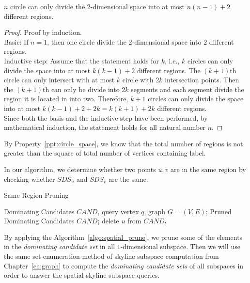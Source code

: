 \begin{property}
\label{ppt:circle_space}
$n$ circle can only divide the $2$-dimensional space into at most $n(n-1)+2$ different regions.
\end{property}

\begin{proof}
Proof by induction.\\
Basic: If $n=1$, then one circle divide the $2$-dimensional space into $2$ different regions.\\
Inductive step: Assume that the statement holds for $k$, i.e., $k$ circles can only divide the space into at most $k(k-1)+2$ different regions. The $(k+1)$th circle can only intersect with at most $k$ circle with $2k$ intersection points. Then the $(k+1)$th can only be divide into $2k$ segments and each segment divide the region it is located in into two. Therefore, $k+1$ circles can only divide the space into at most $k(k-1)+2+2k = k(k+1)+2k$ different regions.\\
Since both the basis and the inductive step have been performed, by mathematical induction, the statement holds for all natural number $n$.
\end{proof}

By Property~\ref{ppt:circle_space}, we know that the total number of regions is not greater than the square of total number of vertices containing label. 

In our algorithm, we determine whether two points $u, v$ are in the same region by checking whether $SDS_u$ and $SDS_v$ are the same.

\begin{algorithm}[H]
  \caption{Same Region Pruning}
  \label{algo:spatial_prune}
  \begin{algorithmic}[1]
  \show\LOOP
    \REQUIRE Dominating Candidates $CAND$, query vertex $q$, graph $G=(V, E)$;
    \ENSURE Pruned Dominating Candidates $CAND$;
                \STATE delete $u$ from $CAND_l$
            \ENDIF
        \ENDFOR
    \ENDFOR
  \end{algorithmic}
\end{algorithm}

By applying the Algorithm~\ref{algo:spatial_prune}, we prune some of the elements in the \emph{dominating candidate set} in all $1$-dimensional subspace. Then we will use the same set-enumeration method of skyline subspace computation from Chapter~\ref{ch:graph} to compute the \emph{dominating candidate sets} of all subspaces in order to answer the spatial skyline subspace queries.
